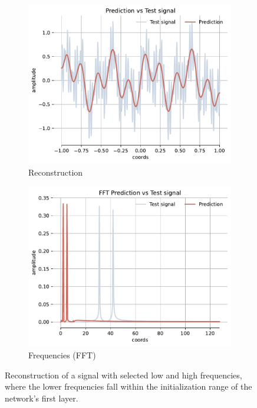 \begin{figure}[h!]
    \centering
    \begin{subfigure}[b]{0.38\textwidth}
        \centering
        \includegraphics[width=\textwidth]{img/ch4/prediction_w0_2pi.pdf}
        \caption{Reconstruction}
        \label{fig:rec-2pi-w0}
    \end{subfigure}
    \begin{subfigure}[b]{0.38\textwidth}
        \centering
        \includegraphics[width=\textwidth]{img/ch4/fft_w0_2pi.pdf}
        \caption{Frequencies (FFT)}
        \label{fig:fft-low-4freqs}
    \end{subfigure}
    \label{f:4freqs-low-reconstruction}
    \caption{Reconstruction of a signal with selected low and high frequencies, where the lower frequencies fall within the initialization range of the network's first layer.}
\end{figure}


